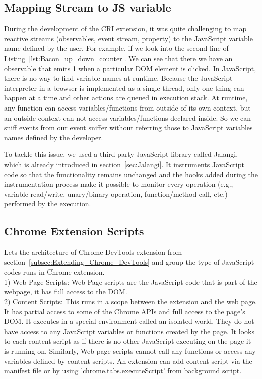 \subsection{Mapping Stream to JS variable}
During the development of the CRI extension, it was quite challenging to map reactive streams (observables, event stream, property) to the JavaScript variable name defined by the user. For example, if we look into the second line of Listing~\ref{lst:Bacon_up_down_counter}. We can see that there we have an observable that emits 1 when a particular DOM element is clicked. In JavaScript, there is no way to find variable names at runtime. Because the JavaScript interpreter in a browser is implemented as a single thread, only one thing can happen at a time and other actions are queued in execution stack. At runtime, any function can access variables/functions from outside of its own context, but an outside context can not access variables/functions declared inside.
So we can sniff events from our event sniffer without referring those to JavaScript variables names defined by the developer. 

To tackle this issue, we used a third party JavaScript library called Jalangi, which is already introduced in section~\ref{sec:Jalangi}. 
It instruments JavaScript code so that the functionality remains unchanged and the hooks added during the instrumentation process make it possible to monitor every operation (e.g., variable read/write, unary/binary operation, function/method call, etc.) performed by the execution.

\subsection{Chrome Extension Scripts}
Lets the architecture of Chrome DevTools extension from section~\ref{subsec:Extending_Chrome_DevTools} and group the type of JavaScript codes runs in Chrome extension.\\

1) Web Page Scripts: Web Page scripts are the JavaScript code that is part of the webpage, it has full access to the DOM.\\

2) Content Scripts: This runs in a scope between the extension and the web page.  It has partial access to some of the Chrome APIs and full access to the page's DOM. It executes in a special environment called an isolated world. They do not have access to any JavaScript variables or functions created by the page. It looks to each content script as if there is no other JavaScript executing on the page it is running on. Similarly, Web page scripts cannot call any functions or access any variables defined by content scripts.
An extension can add content script via the manifest file or by using 'chrome.tabs.executeScript' from background script.\\

